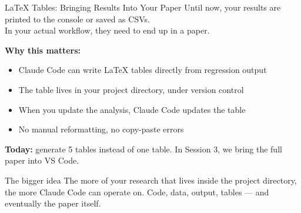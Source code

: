 \begin{frame}{\LaTeX{} Tables: Bringing Results Into Your Paper}
  Until now, your results are printed to the console or saved as CSVs.\\
  In your actual workflow, they need to end up in a paper.

  \vspace{0.8em}
  \textbf{Why this matters:}
  \begin{itemize}
    \item Claude Code can write \LaTeX{} tables directly from regression output
    \item The table lives in your project directory, under version control
    \item When you update the analysis, Claude Code updates the table
    \item No manual reformatting, no copy-paste errors
  \end{itemize}

  \vspace{0.8em}
  \textbf{Today:} generate 5 tables instead of one table. In Session 3, we bring the full paper into VS Code.

  \vspace{0.5em}
  \begin{block}{The bigger idea}
    The more of your research that lives inside the project directory, the more Claude Code
    can operate on. Code, data, output, tables --- and eventually the paper itself.
  \end{block}
\end{frame}


